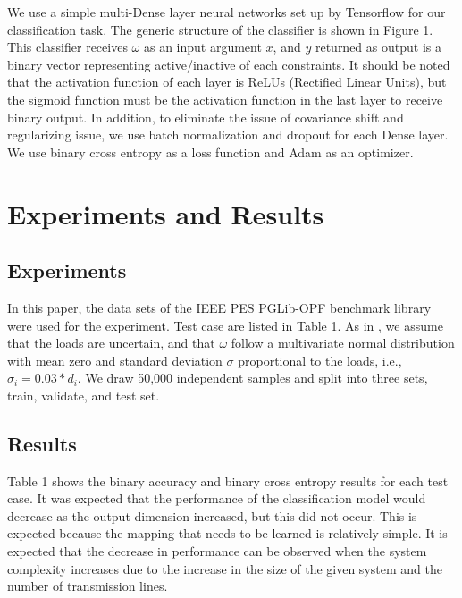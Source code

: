\documentclass[11pt]{article}
\begin{document}
We use a simple multi-Dense layer neural networks set up by Tensorflow for our classification task. The generic structure of the classifier is shown in Figure 1. This classifier receives $\omega$ as an input argument $x$, and $y$ returned as output is a binary vector representing active/inactive of each constraints. It should be noted that the activation function of each layer is ReLUs (Rectified Linear Units), but the sigmoid function must be the activation function in the last layer to receive binary output. In addition, to eliminate the issue of covariance shift and regularizing issue, we use batch normalization\cite{batch_norm} and dropout\cite{dropout} for each Dense layer. We use binary cross entropy\cite{bin_cross_entropy} as a loss function and Adam\cite{adam} as an optimizer.


\section{Experiments and Results}\label{sec:experiment_result}
\subsection{Experiments}
In this paper, the data sets of the IEEE PES PGLib-OPF benchmark library \cite{pglib-opf} were used for the experiment. Test case are listed in Table 1. As in \cite{learning_dc_opf}, we assume that the loads are uncertain, and that $\omega$ follow a multivariate normal distribution with mean zero and standard deviation $\sigma$ proportional to the loads, i.e., $\sigma_{i} = 0.03*d_{i}$. We draw 50,000 independent samples and split into three sets, train, validate, and test set.  

\subsection{Results}
Table 1 shows the binary accuracy and binary cross entropy results for each test case. It was expected that the performance of the classification model would decrease as the output dimension increased, but this did not occur. This is expected because the mapping that needs to be learned is relatively simple. It is expected that the decrease in performance can be observed when the system complexity increases due to the increase in the size of the given system and the number of transmission lines. 
\end{document}
